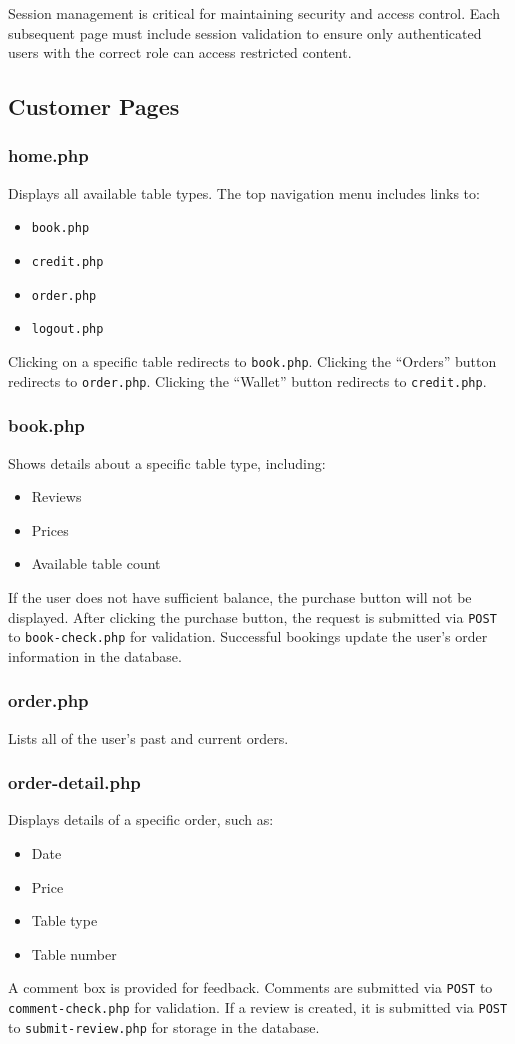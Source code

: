 \documentclass[12pt]{article}
\begin{document}
Session management is critical for maintaining security and access control. Each subsequent page must include session validation to ensure only authenticated users with the correct role can access restricted content.

\subsection{Customer Pages}

\subsubsection{home.php}
Displays all available table types. The top navigation menu includes links to:
\begin{itemize}
    \item \texttt{book.php}
    \item \texttt{credit.php}
    \item \texttt{order.php}
    \item \texttt{logout.php}
\end{itemize}
Clicking on a specific table redirects to \texttt{book.php}.  
Clicking the ``Orders'' button redirects to \texttt{order.php}.  
Clicking the ``Wallet'' button redirects to \texttt{credit.php}.

\subsubsection{book.php}
Shows details about a specific table type, including:
\begin{itemize}
    \item Reviews
    \item Prices
    \item Available table count
\end{itemize}
If the user does not have sufficient balance, the purchase button will not be displayed.  
After clicking the purchase button, the request is submitted via \texttt{POST} to \texttt{book-check.php} for validation. Successful bookings update the user's order information in the database.

\subsubsection{order.php}
Lists all of the user's past and current orders.

\subsubsection{order-detail.php}
Displays details of a specific order, such as:
\begin{itemize}
    \item Date
    \item Price
    \item Table type
    \item Table number
\end{itemize}
A comment box is provided for feedback.  
Comments are submitted via \texttt{POST} to \texttt{comment-check.php} for validation.  
If a review is created, it is submitted via \texttt{POST} to \texttt{submit-review.php} for storage in the database.
\end{document}
